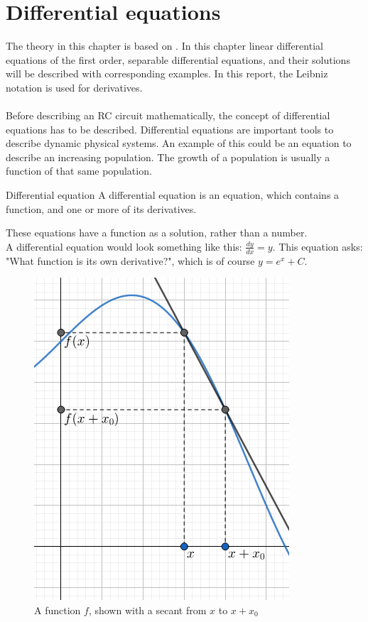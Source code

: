 \chapter{Differential equations} 
The theory in this chapter is based on \cite{diffandcomplex}. In this chapter linear differential equations of the first order, separable differential equations, and their solutions will be described with corresponding examples. In this report, the Leibniz notation is used for derivatives. 
\\
\\
Before describing an RC circuit mathematically, the concept of differential equations has to be described. Differential equations are important tools to describe dynamic physical systems. An example of this could be an equation to describe an increasing population. The growth of a population is usually a function of that same population.
\begin{definition}{Differential equation}{}
A differential equation is an equation, which contains a function, and one or more of its derivatives.
\end{definition}
\noindent%
These equations have a function as a solution, rather than a number. 
\\
A differential equation would look something like this: $\frac{dy}{dx} = y$. This equation asks: "What function is its own derivative?", which is of course $y=e^x+C$.
\\
\setlength\intextsep{0pt}
\begin{figure}[H]
	\includegraphics[scale=0.5]{fig/img/dydx.png}
	\caption{A function $f$, shown with a secant from $x$ to $x+x_0$}\label{wrap-fig:1}
\end{figure}
